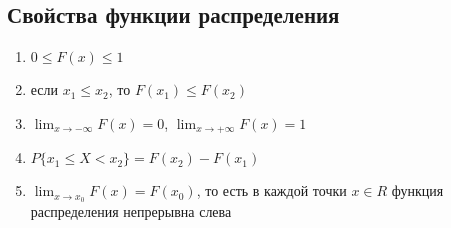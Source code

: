 \documentclass[a4paper, 14pt]{report}
\begin{document}
\subsection{Свойства функции распределения}

\begin{enumerate}
    \item $0 \le F(x) \le 1$
    \item если $x_1 \le x_2$, то $F(x_1) \le F(x_2)$
    \item $\lim_{x \to - \infty} F(x) = 0$, $\lim_{x \to +\infty} F(x) = 1$
    \item $P\{x_1 \le X < x_2\} = F(x_2) - F(x_1)$
    \item $\lim_{x \to x_0} F(x) = F(x_0)$, то есть в каждой точки $x \in R$ функция распределения непрерывна слева
\end{enumerate}
\end{document}
